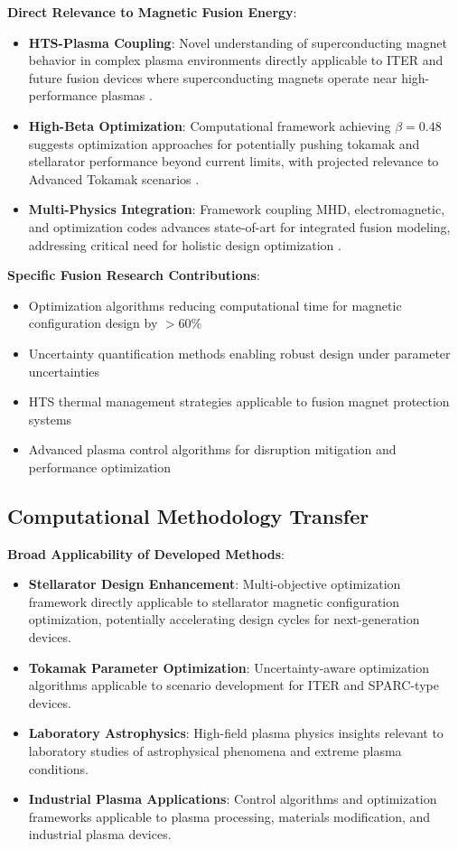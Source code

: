 \documentclass[12pt,a4paper]{article}
\begin{document}
\textbf{Direct Relevance to Magnetic Fusion Energy}:
\begin{itemize}
\item \textbf{HTS-Plasma Coupling}: Novel understanding of superconducting magnet behavior in complex plasma environments directly applicable to ITER and future fusion devices where superconducting magnets operate near high-performance plasmas \cite{senatore2014progress,wesson2011tokamaks}.
\item \textbf{High-Beta Optimization}: Computational framework achieving $\beta = 0.48$ suggests optimization approaches for potentially pushing tokamak and stellarator performance beyond current limits, with projected relevance to Advanced Tokamak scenarios \cite{Plasma2023}.
\item \textbf{Multi-Physics Integration}: Framework coupling MHD, electromagnetic, and optimization codes advances state-of-art for integrated fusion modeling, addressing critical need for holistic design optimization \cite{PlasmaPhysics2023}.
\end{itemize}

\textbf{Specific Fusion Research Contributions}:
\begin{itemize}
\item Optimization algorithms reducing computational time for magnetic configuration design by $>60\%$
\item Uncertainty quantification methods enabling robust design under parameter uncertainties
\item HTS thermal management strategies applicable to fusion magnet protection systems
\item Advanced plasma control algorithms for disruption mitigation and performance optimization
\end{itemize}

\subsection{Computational Methodology Transfer}

\textbf{Broad Applicability of Developed Methods}:
\begin{itemize}
\item \textbf{Stellarator Design Enhancement}: Multi-objective optimization framework directly applicable to stellarator magnetic configuration optimization, potentially accelerating design cycles for next-generation devices.
\item \textbf{Tokamak Parameter Optimization}: Uncertainty-aware optimization algorithms applicable to scenario development for ITER and SPARC-type devices.
\item \textbf{Laboratory Astrophysics}: High-field plasma physics insights relevant to laboratory studies of astrophysical phenomena and extreme plasma conditions.
\item \textbf{Industrial Plasma Applications}: Control algorithms and optimization frameworks applicable to plasma processing, materials modification, and industrial plasma devices.
\end{itemize}
\end{document}
